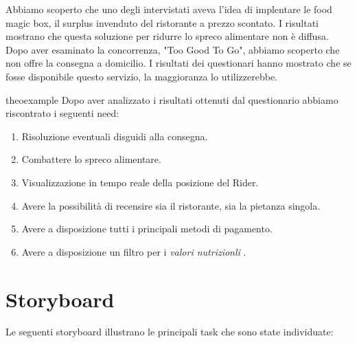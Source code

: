 \documentclass{article}
\begin{document}
Abbiamo scoperto che uno degli intervistati aveva l'idea di implentare le food magic box, il surplus invenduto del ristorante a prezzo scontato. I risultati mostrano che questa soluzione per ridurre lo spreco alimentare non è diffusa. Dopo aver esaminato la concorrenza, "Too Good To Go", abbiamo scoperto che non offre la consegna a domicilio. I risultati dei questionari hanno mostrato che se fosse disponibile questo servizio, la maggioranza lo utilizzerebbe.
\vspace{1.5cm}
\begin{need}{}{theoexample}
    Dopo aver analizzato i risultati ottenuti dal questionario abbiamo riscontrato i seguenti need:
    \begin{enumerate}
        \item Risoluzione eventuali disguidi alla consegna.
        \item Combattere lo spreco alimentare.
        \item Visualizzazione in tempo reale della posizione del Rider.
        \item Avere la possibilità di recensire sia il ristorante, sia la pietanza singola.
        \item Avere a disposizione tutti i principali metodi di pagamento.
        \item Avere a disposizione un filtro per i \textit{valori nutrizionli} .
    \end{enumerate}
    \end{need}

    \vspace{1cm}
 \vspace{4cm}
\pagebreak
\section{Storyboard} \par
Le seguenti storyboard illustrano le principali task che sono state individuate:
\end{document}
